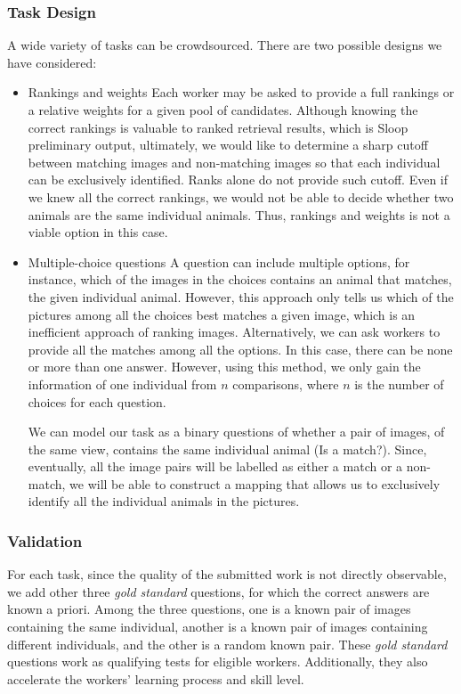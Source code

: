 \subsubsection{Task Design}

A wide variety of tasks can be crowdsourced. There are two possible designs we
have considered:
\begin{itemize}
	\item Rankings and weights
    Each worker may be asked to provide a full rankings or a relative weights
    for a given pool of candidates. Although knowing the correct rankings is
    valuable to ranked retrieval results, which is Sloop preliminary output,
    ultimately, we would like to determine a sharp cutoff between matching
    images and non-matching images so that each individual can be exclusively
    identified. Ranks alone do not provide such cutoff. Even if we knew all the
    correct rankings, we would not be able to decide whether two animals are
    the same individual animals. Thus, rankings and weights is not a viable
    option in this case.
	\item Multiple-choice questions
    A question can include multiple options, for instance, which of the images
    in the choices contains an animal that matches, the given individual
    animal. However, this approach only tells us which of the pictures among
    all the choices best matches a given image, which is an inefficient
    approach of ranking images. Alternatively, we can ask workers to provide
    all the matches among all the options. In this case, there can be none or
    more than one answer. However, using this method, we only gain the
    information of one individual from $n$ comparisons, where $n$ is the number
    of choices for each question.

    We can model our task as a binary questions of whether a pair of images, of
    the same view, contains the same individual animal (Is a match?). Since,
    eventually, all the image pairs will be labelled as either a match or a
    non-match, we will be able to construct a mapping that allows us to
    exclusively identify all the individual animals in the pictures.
\end{itemize}

\subsubsection{Validation}
\label{subsub:validation}

For each task, since the quality of the submitted work is not directly
observable, we add other three \emph{gold standard} questions, for which the
correct answers are known a priori. Among the three questions, one is a known
pair of images containing the same individual, another is a known pair of
images containing different individuals, and the other is a random known pair.
These \emph{gold standard} questions work as qualifying tests for eligible
workers. Additionally, they also accelerate the workers' learning process and
skill level.

